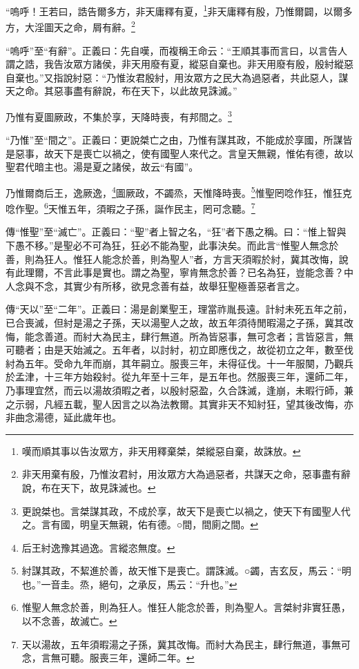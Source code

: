 “嗚呼！王若曰，誥告爾多方，非天庸釋有夏，\footnote{嘆而順其事以告汝眾方，非天用釋棄桀，桀縱惡自棄，故誅放。}非天庸釋有殷，乃惟爾闢，以爾多方，大淫圖天之命，屑有辭。\footnote{非天用棄有殷，乃惟汝君紂，用汝眾方大為過惡者，共謀天之命，惡事盡有辭說，布在天下，故見誅滅也。}

{\noindent\shu{}\fzkt “嗚呼”至“有辭”。正義曰：先自嘆，而複稱王命云：“王順其事而言曰，以言告人謂之誥，我告汝眾方諸侯，非天用廢有夏，縱惡自棄也。非天用廢有殷，殷紂縱惡自棄也。”又指說紂惡：“乃惟汝君殷紂，用汝眾方之民大為過惡者，共此惡人，謀天之命。其惡事盡有辭說，布在天下，以此故見誅滅。” \par}

乃惟有夏圖厥政，不集於享，天降時喪，有邦間之。\footnote{更說桀也。言桀謀其政，不成於享，故天下是喪亡以禍之，使天下有國聖人代之。言有國，明皇天無親，佑有德。○間，間廁之間。}

{\noindent\shu{}\fzkt “乃惟”至“間之”。正義曰：更說桀亡之由，乃惟有謀其政，不能成於享國，所謀皆是惡事，故天下是喪亡以禍之，使有國聖人來代之。言皇天無親，惟佑有德，故以聖君代暗主也。湯是夏之諸侯，故云“有國”。 \par}

乃惟爾商后王，逸厥逸，\footnote{后王紂逸豫其過逸。言縱恣無度。}圖厥政，不蠲烝，天惟降時喪。\footnote{紂謀其政，不絜進於善，故天惟下是喪亡。謂誅滅。○蠲，吉玄反，馬云：“明也。”一音圭。烝，絕句，之承反，馬云：“升也。”}惟聖罔唸作狂，惟狂克唸作聖。\footnote{惟聖人無念於善，則為狂人。惟狂人能念於善，則為聖人。言桀紂非實狂愚，以不念善，故滅亡。}天惟五年，須暇之子孫，誕作民主，罔可念聽。\footnote{天以湯故，五年須暇湯之子孫，冀其改悔。而紂大為民主，肆行無道，事無可念，言無可聽。服喪三年，還師二年。}


{\noindent\zhuan{}\fzbyks 傳“惟聖”至“滅亡”。正義曰：“聖”者上智之名，“狂”者下愚之稱。曰：“惟上智與下愚不移。”是聖必不可為狂，狂必不能為聖，此事決矣。而此言“惟聖人無念於善，則為狂人。惟狂人能念於善，則為聖人”者，方言天須暇於紂，冀其改悔，說有此理爾，不言此事是實也。謂之為聖，寧肯無念於善？已名為狂，豈能念善？中人念與不念，其實少有所移，欲見念善有益，故舉狂聖極善惡者言之。 \par}

{\noindent\zhuan{}\fzbyks 傳“天以”至“二年”。正義曰：湯是創業聖王，理當祚胤長遠。計紂未死五年之前，已合喪滅，但紂是湯之子孫，天以湯聖人之故，故五年須待閒暇湯之子孫，冀其改悔，能念善道。而紂大為民主，肆行無道。所為皆惡事，無可念者；言皆惡言，無可聽者；由是天始滅之。五年者，以討紂，初立即應伐之，故從初立之年，數至伐紂為五年。受命九年而崩，其年嗣立。服喪三年，未得征伐。十一年服闋，乃觀兵於孟津，十三年方始殺紂。從九年至十三年，是五年也。然服喪三年，還師二年，乃事理宜然，而云以湯故須暇之者，以殷紂惡盈，久合誅滅，逢崩，未暇行師，兼之示弱，凡經五載，聖人因言之以為法教爾。其實非天不知紂狂，望其後改悔，亦非曲念湯德，延此歲年也。 \par}

